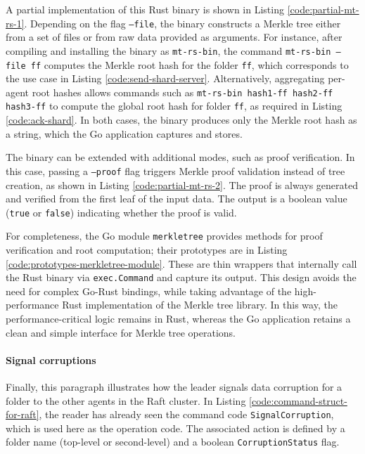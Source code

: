 A partial implementation of this Rust binary is shown in Listing
\ref{code:partial-mt-rs-1}. Depending on the flag \texttt{--file}, the binary constructs a 
Merkle tree either from a set of files or from raw data provided as arguments. For instance, 
after compiling and installing the binary as \texttt{mt-rs-bin}, the command 
\texttt{mt-rs-bin --file ff} computes the Merkle root hash for the folder \texttt{ff}, 
which corresponds to the use case in Listing \ref{code:send-shard-server}. Alternatively, 
aggregating per-agent root hashes allows commands such as 
\texttt{mt-rs-bin hash1-ff hash2-ff hash3-ff} to compute the global root hash for folder 
\texttt{ff}, as required in Listing \ref{code:ack-shard}. In both cases, the binary 
produces only the Merkle root hash as a string, which the Go application captures and stores.  

The binary can be extended with additional modes, such as proof verification. 
In this case, passing a \texttt{--proof} flag triggers Merkle proof validation instead of 
tree creation, as shown in Listing \ref{code:partial-mt-rs-2}. The proof is always generated 
and verified from the first leaf of the input data. The output is 
a boolean value (\texttt{true} or \texttt{false}) indicating whether the proof is valid.  

For completeness, the Go module \texttt{merkletree} provides methods for 
proof verification and root computation; their prototypes are in Listing \ref{code:prototypes-merkletree-module}. 
These are thin wrappers that internally call the Rust binary via 
\texttt{exec.Command} and capture its output. This design avoids the need for 
complex Go-Rust bindings, while taking advantage of the high-performance Rust 
implementation of the Merkle tree library. In this way, the performance-critical 
logic remains in Rust, whereas the Go application retains a clean and simple 
interface for Merkle tree operations.  

\paragraph{Signal corruptions}
Finally, this paragraph illustrates how the leader signals data corruption for a folder
to the other agents in the Raft cluster. In Listing
\ref{code:command-struct-for-raft}, the reader has already seen the command code
\texttt{SignalCorruption}, which is used here as the operation code. The
associated action is defined by a folder name (top-level or second-level) and a
boolean \texttt{CorruptionStatus} flag.

